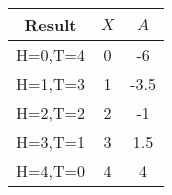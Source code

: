\begin{tabular}{|c|c|c|}\hline
Result		&$X$		&$A$\\\hline
H=0,T=4		&0		&-6\\\hline
H=1,T=3		&1		&-3.5\\\hline
H=2,T=2		&2		&-1\\\hline
H=3,T=1		&3		&1.5\\\hline
H=4,T=0		&4		&4\\\hline
\end{tabular}

